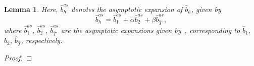 \documentclass{article}
\newcommand{\est}{\text{\,e.s.t.}\xspace}
\newtheorem{lemma}[thm]{Lemma}
\newcommand{\nsep}{\ensuremath{n\sqrt{\epsilon}}}
\newcommand{\hatT}{\ensuremath{{\hat{T}}}}
\newcommand{\hatb}{\ensuremath{\hat{b}}}
\begin{document}
\begin{appendix}
\begin{lemma}
Here, $\hatb_h^{as}$ denotes the asymptotic expansion of $\hatb_h$, given by
\begin{equation}\label{bhas}
\hatb_h^{as} =  \hatb_1^{as} + \alpha \hatb_2^{as} + \beta \hatb_\hatT^{as},
\end{equation}
 where $\hatb_1^{as}$,  $\hatb_2^{as}$, $\hatb_\hatT^{as}$ are the asymptotic expansions given by~\cite{GieEtAl:13}, corresponding to  $\hatb_1$,  $\hatb_2$, $\hatb_\hatT$, respectively.
\end{lemma}
\begin{proof}


\end{proof}
\end{appendix}
\end{document}
